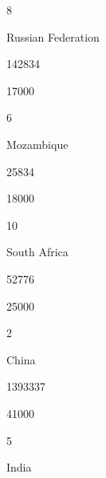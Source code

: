 \documentclass[letterpaper,10pt,english]{sphinxmanual}
\begin{document}
8





Russian Federation





142834





17000









6





Mozambique





25834





18000









10





South Africa





52776





25000









2





China





1393337





41000









5





India
\end{document}
